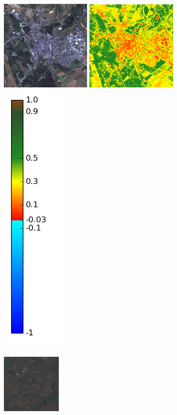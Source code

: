 \documentclass{book}
\begin{document}
\begin{figure}[H]
\centerline{
\includegraphics[scale=0.9]{../3_ndvi/images/Abbeville/07_rgb.png}
\includegraphics[scale=0.9]{../3_ndvi/images/Abbeville/07_ndvi.png}
\includegraphics[scale=0.3]{../3_ndvi/images/colormap.png}
}
\centerline{
\includegraphics[scale=0.9]{../3_ndvi/images/Louvres/07_rgb.png}
}
\end{figure}
\end{document}
